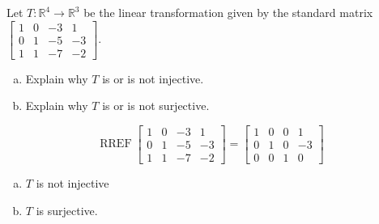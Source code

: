 
\begin{exerciseStatement}
 Let \(T:\mathbb{R}^ 4  \to \mathbb{R}^ 3 \) be the linear transformation given by the standard matrix \( \left[\begin{array}{cccc}
1 & 0 & -3 & 1 \\
0 & 1 & -5 & -3 \\
1 & 1 & -7 & -2
\end{array}\right] .\)
\begin{enumerate}[(a)]
\item Explain why \(T\) is or is not injective.
\item Explain why \(T\) is or is not surjective.
\end{enumerate}
    
\end{exerciseStatement}
    
\begin{exerciseAnswer} 


\[\operatorname{RREF} \left[\begin{array}{cccc}
1 & 0 & -3 & 1 \\
0 & 1 & -5 & -3 \\
1 & 1 & -7 & -2
\end{array}\right] = \left[\begin{array}{cccc}
1 & 0 & 0 & 1 \\
0 & 1 & 0 & -3 \\
0 & 0 & 1 & 0
\end{array}\right] \]


\begin{enumerate}[(a)]
\item \(T\) is not injective
\item \(T\) is surjective.
\end{enumerate}
    
\end{exerciseAnswer}
    
